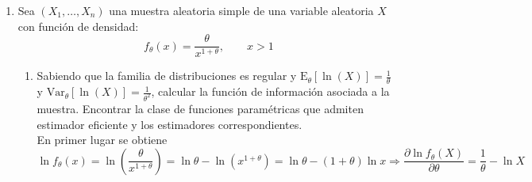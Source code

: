 \documentclass[12pt]{article}
\newcommand{\E}{\mathrm{E}}
\newcommand{\V}{\mathrm{Var}}
\begin{document}
\begin{ejercicio}
\begin{enumerate}[label=\alph*)]
                y ahora integramos respecto de $\theta$ para hallar $Q(\theta)$:
                $$Q'(\theta) = 4 \theta \Longrightarrow Q(\theta) + c_1 = \int Q'(\theta) d \theta = \int 4 \theta d \theta = 4 \dfrac{\theta^2}{2} = 2 \theta^2 + c_2 \Longrightarrow
                Q(\theta) = 2 \theta^2 + c_2 - c_1$$
                llamando $c_2 - c_1 \equiv c$, determinamos su valor con la condición inicial $Q(1) = 0$.
                $$2 + c = Q(1) = 0 \Longrightarrow c = -2 \Longrightarrow Q(\theta) = 2 \theta^2 - 2$$
                Como hemos visto que $Q'(\theta) = 4 \theta$, sustituimos esta expresión en $(\ref{eq:rel1ej2a})$ y obtenemos $D(\theta)$ igual que con $Q(\theta)$:
                $$D'(\theta) = - \theta^4 Q'(\theta) = - \theta^4 4 \theta = - 4 \theta^5 \Longrightarrow$$
                $$D(\theta) + k_1 = \int D'(\theta) d \theta = - 4 \int \theta^5 d \theta = - 4 \dfrac{\theta^6}{6} + k_2 = \dfrac{-2\theta^6}{3} + k_2 \Longrightarrow D(\theta) = \dfrac{-2\theta^6}{3} + k_2 - k_1$$
                llamando $k_2 - k_1 \equiv k$, determinamos su valor con la condición inicial $D(0) = 1$.
                $$k = D(0) = 1 \Longrightarrow D(\theta) = \dfrac{-2\theta^6}{3} + 1$$
                En resumen, las funciones $Q(\theta)$ y $D(\theta)$ son:
                $$Q(\theta) = 2 \theta^2 - 2 \quad D(\theta) = \dfrac{-2\theta^6}{3} + 1$$

                \newpage
            \item Sea $(X_1,\ldots,X_n)$ una muestra aleatoria simple de una variable aleatoria $X$ con función de densidad:
                \begin{equation*}
                    f_\theta(x) = \frac{\theta}{x^{1+\theta}}, \qquad x>1
                \end{equation*}
                \begin{enumerate}[label=\alph*)]
                    \item Sabiendo que la familia de distribuciones es regular y 
                    $\E_\theta[\ln(X)] = \frac{1}{\theta}$ y $\V_\theta[\ln(X)] = \frac{1}{\theta^2}$, 
                    calcular la función de información asociada a la muestra. Encontrar la clase de 
                    funciones paramétricas que admiten estimador eficiente y los estimadores 
                    correspondientes. \\

                    En primer lugar se obtiene
                    $$\ln f_\theta(x) = \ln \left( \frac{\theta}{x^{1+\theta}} \right) = 
                    \ln \theta - \ln \left(x^{1 + \theta} \right) = 
                    \ln \theta - (1+\theta) \ln x \Longrightarrow 
                    \dfrac{\partial \ln f_\theta(X)}{\partial \theta} = \dfrac{1}{\theta} - \ln X$$


\end{enumerate}
\end{enumerate}
\end{ejercicio}
\end{document}
